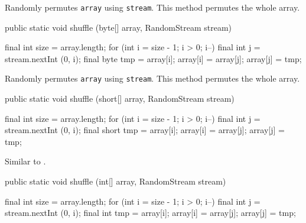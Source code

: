 \begin{tabb}   Randomly permutes \texttt{array} using \texttt{stream}.
  This method permutes the whole array.
\end{tabb}
\begin{htmlonly}
\end{htmlonly}
\begin{code}

   public static void shuffle (byte[] array, RandomStream stream)\begin{hide} {
      final int size = array.length;
      for (int i = size - 1; i > 0; i--) {
         final int j = stream.nextInt (0, i);
         final byte tmp = array[i];
         array[i] = array[j];
         array[j] = tmp;
      }
   }\end{hide}
\end{code}
\begin{tabb} Randomly permutes \texttt{array} using \texttt{stream}.
  This method permutes the whole array.
\end{tabb}
\begin{htmlonly}
\end{htmlonly}
\begin{code}

   public static void shuffle (short[] array, RandomStream stream)\begin{hide} {
      final int size = array.length;
      for (int i = size - 1; i > 0; i--) {
         final int j = stream.nextInt (0, i);
         final short tmp = array[i];
         array[i] = array[j];
         array[j] = tmp;
      }
   }\end{hide}
\end{code}
\begin{tabb} Similar to .
\end{tabb}
\begin{htmlonly}
\end{htmlonly}
\begin{code}

   public static void shuffle (int[] array, RandomStream stream)\begin{hide} {
      final int size = array.length;
      for (int i = size - 1; i > 0; i--) {
         final int j = stream.nextInt (0, i);
         final int tmp = array[i];
         array[i] = array[j];
         array[j] = tmp;
      }
   }\end{hide}
\end{code}
